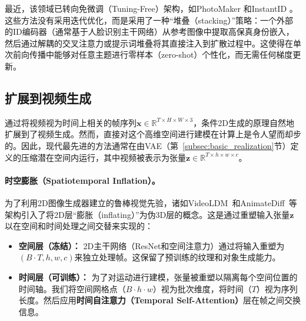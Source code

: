 \documentclass[../../book-main_zh.tex]{subfiles}
\begin{document}
最近，该领域已转向免微调（Tuning-Free）架构，如PhotoMaker \cite{li2024photomaker}和InstantID \cite{wang2024instantid}。这些方法没有采用迭代优化，而是采用了一种“堆叠（stacking）”策略：一个外部的ID编码器（通常基于人脸识别主干网络）从参考图像中提取高保真身份嵌入，然后通过解耦的交叉注意力或提示词堆叠将其直接注入到扩散过程中。这使得在单次前向传播中能够对任意主题进行零样本（zero-shot）个性化，而无需任何梯度更新。



\subsection{扩展到视频生成}
\label{subsec:video_gen}

通过将视频视为时间上相关的帧序列$\boldsymbol{x} \in \mathbb{R}^{T \times H \times W \times 3}$，条件2D生成的原理自然地扩展到了视频生成。然而，直接对这个高维空间进行建模在计算上是令人望而却步的。因此，现代最先进的方法通常在由VAE（第~\ref{subsec:basic_realization}节）定义的压缩潜在空间内运行，其中视频被表示为张量$\boldsymbol{z} \in \mathbb{R}^{T \times h \times w \times c}$。

\paragraph{时空膨胀（Spatiotemporal Inflation）。}
为了利用2D图像生成器建立的鲁棒视觉先验，诸如VideoLDM~\citep{blattmann2023align}和AnimateDiff~\citep{guo2023animatediff}等架构引入了将2D层“膨胀（inflating）”为伪3D层的概念。这是通过重塑输入张量$\boldsymbol{z}$以在空间和时间处理之间交替来实现的：
\begin{itemize}
    \item \textbf{空间层（冻结）：} 2D主干网络（ResNet和空间注意力）通过将输入重塑为$(B \cdot T, h, w, c)$来独立处理帧。这保留了预训练的纹理和对象生成能力。
    \item \textbf{时间层（可训练）：} 为了对运动进行建模，张量被重塑以隔离每个空间位置的时间轴。我们将空间网格点（$B \cdot h \cdot w$）视为批次维度，将时间（$T$）视为序列长度。然后应用\textbf{时间自注意力（Temporal Self-Attention）}层在帧之间交换信息。
\end{itemize}
\end{document}
